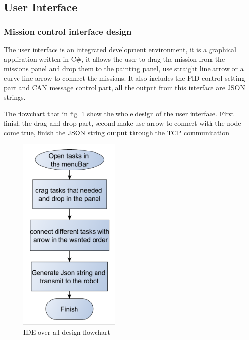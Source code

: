 \subsection{User Interface}	
	\subsubsection{Mission control interface design} %
	\noindent
The user interface is an integrated development environment, it is a graphical application written in C\#, it allows the user to drag the mission from the missions panel and drop them to the painting panel, use straight line arrow or a curve line arrow to connect the missions. It also includes the PID control setting part and CAN message control part, all the output from this interface are JSON strings.

The flowchart that in fig. \ref{IDE_overall_design} show the whole design of the user interface. First finish the drag-and-drop part, second make use arrow to connect with the node come true, finish the JSON string output through the TCP communication.
\begin{figure}[!ht]
	\begin{center}
		\includegraphics[width=50mm]{./Images/Software/IDE_overall_design.png}
		\caption{IDE over all design flowchart}
		\label{IDE_overall_design}
	\end{center}
\end{figure}


